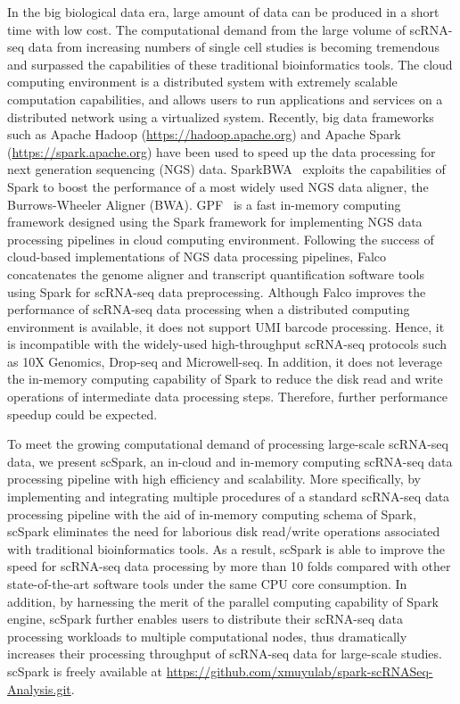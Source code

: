 \documentclass[conference]{IEEEtran}
\begin{document}
In the big biological data era, large amount of data can be produced in a short time with low cost. 
The computational demand from the large volume of scRNA-seq data from increasing numbers of single cell studies is becoming tremendous and surpassed the capabilities of these traditional bioinformatics tools. 
The cloud computing environment is a distributed system with extremely scalable computation capabilities, and allows users to run applications and services on a distributed network using a virtualized system. 
Recently, big data frameworks such as Apache Hadoop (\url{https://hadoop.apache.org}) and Apache Spark (\url{https://spark.apache.org}) have been used to speed up the data processing for next generation sequencing (NGS) data. 
SparkBWA~\cite{Abun2016SparkBWA} exploits the capabilities of Spark to boost the performance of a most widely used NGS data aligner, the Burrows-Wheeler Aligner (BWA). 
GPF~\cite{Li2018Highperformance} is a fast in-memory computing framework designed using the Spark framework for implementing NGS data processing pipelines in cloud computing environment. 
Following the success of cloud-based implementations of NGS data processing pipelines, Falco~\cite{Yang2017Falco} concatenates the genome aligner and transcript quantification software tools using Spark for scRNA-seq data preprocessing.
Although Falco improves the performance of scRNA-seq data processing when a distributed computing environment is available, it does not support UMI barcode processing. Hence, it is incompatible with the widely-used high-throughput scRNA-seq protocols such as 10X Genomics, Drop-seq and Microwell-seq. In addition, it does not leverage the in-memory computing capability of Spark to reduce the disk read and write operations of intermediate data processing steps. Therefore, further performance speedup could be expected. 

To meet the growing computational demand of processing large-scale scRNA-seq data, we present scSpark, an in-cloud and in-memory computing scRNA-seq data processing pipeline with high efficiency and scalability. 
More specifically, by implementing and integrating multiple procedures of a standard scRNA-seq data processing pipeline with the aid of in-memory computing schema of Spark, scSpark eliminates the need for laborious disk read/write operations associated with traditional bioinformatics tools. 
As a result, scSpark is able to improve the speed for scRNA-seq data processing by more than 10 folds compared with other state-of-the-art software tools under the same CPU core consumption. In addition, by harnessing the merit of the parallel computing capability of Spark engine, scSpark further enables users to distribute their scRNA-seq data processing workloads to multiple computational nodes, thus dramatically increases their processing throughput of scRNA-seq data for large-scale studies. 
scSpark is freely available at \url{https://github.com/xmuyulab/spark-scRNASeq-Analysis.git}.
\end{document}
